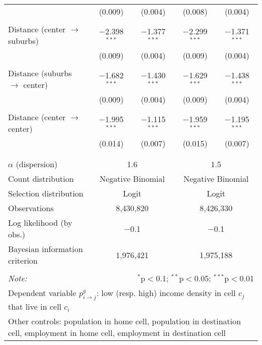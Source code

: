 \begin{table}[!htbp]
{\begin{tabular}{@{\extracolsep{5pt}}lcccc}
 & (0.009) & (0.004) & (0.008) & (0.004)\\
 &  &  &  & \\
Distance (center $\to$ suburbs) & $-$2.398$^{***}$ & $-$1.377$^{***}$ & $-$2.299$^{***}$ & $-$1.371$^{***}$\\
 & (0.009) & (0.004) & (0.009) & (0.004)\\
 &  &  &  & \\
Distance (suburbs $\to$ center) & $-$1.682$^{***}$ & $-$1.430$^{***}$ & $-$1.629$^{***}$ & $-$1.438$^{***}$\\
 & (0.009) & (0.004) & (0.009) & (0.004)\\
 &  &  &  & \\
Distance (center $\to$ center) & $-$1.995$^{***}$ & $-$1.115$^{***}$ & $-$1.959$^{***}$ & $-$1.195$^{***}$\\
 & (0.014) & (0.007) & (0.015) & (0.007)\\
 &  &  &  & \\
\hline \hline \\[-1.8ex]
$\alpha$ (dispersion) & \multicolumn{2}{c}{1.6} & \multicolumn{2}{c}{1.5} \\
Count distribution & \multicolumn{2}{c}{Negative Binomial} & \multicolumn{2}{c}{Negative Binomial} \\
Selection distribution & \multicolumn{2}{c}{Logit} & \multicolumn{2}{c}{Logit} \\
Observations & \multicolumn{2}{c}{8,430,820} & \multicolumn{2}{c}{8,426,330} \\
Log likelihood (by obs.) & \multicolumn{2}{c}{$-$0.1} & \multicolumn{2}{c}{$-$0.1} \\
Bayesian information criterion & \multicolumn{2}{c}{1,976,421} & \multicolumn{2}{c}{1,975,188} \\
\hline
\hline \\[-1.8ex]
\textit{Note:}  & \multicolumn{4}{r}{$^{*}$p$<$0.1; $^{**}$p$<$0.05; $^{***}$p$<$0.01} \\
 \multicolumn{5}{p{0.9\linewidth}}{\parbox[t]{\textwidth}{Dependent variable $p_{i \to j}^g$: low (resp. high) income density in cell $c_j$ that live in cell $c_i$}} \\
\multicolumn{5}{p{0.9\linewidth}}{\parbox[t]{\textwidth}{Other controls: population in home cell, population in destination cell, employment in home cell, employment in destination cell}}
\end{tabular}
}
\end{table}
